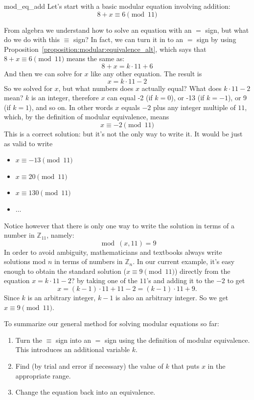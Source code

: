 \begin{example}{mod_eq_add}
Let's start with a basic modular equation involving addition: 
\[
8 + x \equiv 6 \pmod{11}
\]

From algebra we understand how to solve an equation with an $=$ sign, but what do we do with this $ \equiv $ sign?  In fact, we can turn it in to an $=$ sign by using Proposition~\ref{proposition:modular:equivalence_alt}, which says that $8 + x \equiv 6 \pmod{11}$ means the same as:
\[
8 + x = k \cdot 11 + 6
\]
And then we can solve for $x$ like any other equation.  The result is
\[
x = k \cdot 11 - 2
\]
So we solved for $x$, but  what numbers does $x$ actually equal?  What does $k \cdot 11 - 2$ mean?  $k$ is an integer, therefore $x$ can equal -2 (if $k = 0$), or -13 (if $k = -1$), or 9 (if $k = 1$), and so on.  In other words $x$ equals $-2$ plus any integer multiple of $11$, which, by the definition of modular equivalence, means
\[
x \equiv -2 \pmod{11}
\]
This is a correct solution: but it's not the only way to write it. It would be just as valid to write
\begin{itemize}
\item
$x \equiv -13 \pmod{11}$
\item
$x \equiv  20 \pmod{11}$
\item
$x \equiv  130 \pmod{11}$
\item
$\ldots$
\end{itemize}
Notice however that there is only one way to write the solution in terms of a number in ${\mathbb Z}_{11}$, namely:
\[
 \bmod(x,11)=9
\]
In order to avoid ambiguity, mathematicians and textbooks always write solutions mod $n$ in terms of numbers in ${\mathbb Z}_n$. 
In our current example, it's easy enough to obtain the standard solution ($x \equiv 9 \pmod{11}$)  directly from the equation $x = k \cdot 11 - 2$? by taking
one of the $11$'s and adding it to the $-2$ to get
\[
x = (k-1) \cdot 11 + 11 - 2 = (k-1) \cdot 11 + 9.
\]
Since $k$ is an arbitrary integer, $k-1$ is also an arbitrary integer. So we get  $x \equiv 9 \pmod{11}$.

\end{example}

\medskip

\noindent
To summarize our general method for solving modular equations so far:

\begin{enumerate}
\item
Turn the $ \equiv $ sign into an $=$ sign using the definition of modular equivalence. This introduces an additional variable $k$.
\item
Find (by trial and error if necessary) the value of $k$ that puts $x$ in the appropriate range.
\item
Change the equation back into an equivalence.
\end{enumerate}


